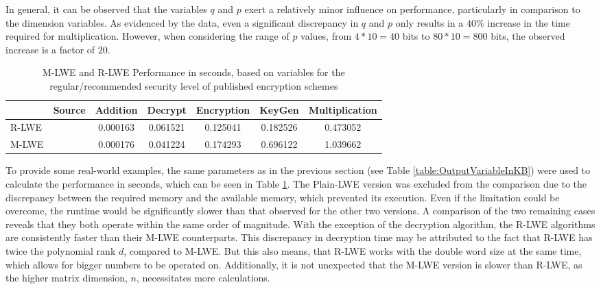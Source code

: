In general, it can be observed that the variables $q$ and $p$ exert a relatively minor influence on performance, particularly in comparison to the dimension variables. As evidenced by the data, even a significant discrepancy in $q$ and $p$ only results in a $40\%$ increase in the time required for multiplication. However, when considering the range of $p$ values, from $4*10=40$ bits to $80*10=800$ bits, the observed increase is a factor of $20$.


\begin{table}[h]
  \centering
  \caption{M-LWE and R-LWE Performance in seconds, based on variables for the regular/recommended security level of published encryption schemes}
  \begin{tabular}{|l|c||c|c|c|c|c|}
    \toprule
          & Source                      & Addition & Decrypt  & Encryption & KeyGen   & Multiplication \\
    \midrule
    R-LWE & \cite{PracticalKeyExchange} & 0.000163 & 0.061521 & 0.125041   & 0.182526 & 0.473052       \\
    M-LWE & \cite{CyrstalsKyber}        & 0.000176 & 0.041224 & 0.174293   & 0.696122 & 1.039662       \\
    \bottomrule
  \end{tabular}
  \label{table:performanceComparison}
\end{table}

To provide some real-world examples, the same parameters as in the previous section (see Table \ref{table:OutputVariableInKB}) were used to calculate the performance in seconds, which can be seen in Table \ref{table:performanceComparison}. The Plain-LWE version was excluded from the comparison due to the discrepancy between the required memory and the available memory, which prevented its execution. Even if the limitation could be overcome, the runtime would be significantly slower than that observed for the other two versions. A comparison of the two remaining cases reveals that they both operate within the same order of magnitude. With the exception of the decryption algorithm, the R-LWE algorithms are consistently faster than their M-LWE counterparts. This discrepancy in decryption time may be attributed to the fact that R-LWE has twice the polynomial rank $d$, compared to M-LWE. But this also means, that R-LWE works with the double word size at the same time, which allows for bigger numbers to be operated on. Additionally, it is not unexpected that the M-LWE version is slower than R-LWE, as the higher matrix dimension, $n$, necessitates more calculations.

